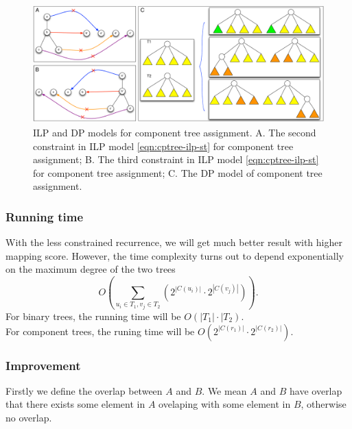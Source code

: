 \begin{figure}[htbp]
\centering
\includegraphics[width=1.0\textwidth]{images/treeassign_cptree}
\caption[ILP and DP models for component tree assignment]{ILP and DP models for component tree assignment. A. The second constraint in ILP model \ref{eqn:cptree-ilp-st} for component tree assignment; B. The third constraint in ILP model \ref{eqn:cptree-ilp-st} for component tree assignment; C. The DP model of component tree assignment.}
\label{fig:treeassign-cptree}
\end{figure}

\subsubsection{Running time}
With the less constrained recurrence, we will get much better result with higher mapping score. However, the time complexity turns out to depend exponentially on the maximum degree of the two trees
\begin{equation} \label{eqn:lcdp-time}
O\left(\sum_{u_i \in T_1, v_j \in T_2}(2^{|C(u_i)|}\cdot 2^{|C(v_j)|})\right).
\end{equation}
For binary trees, the running time will be
$O(|T_1|\cdot|T_2)$.\\ 
For component trees, the runing time will be 
$O\left(2^{|C(r_1)|}\cdot2^{|C(r_2)|}\right)$.
 
\subsubsection{Improvement}
Firstly we define the overlap between $A$ and $B$. We mean $A$ and $B$ have overlap that there exists some element in $A$ ovelaping with some element in $B$, otherwise no overlap.

